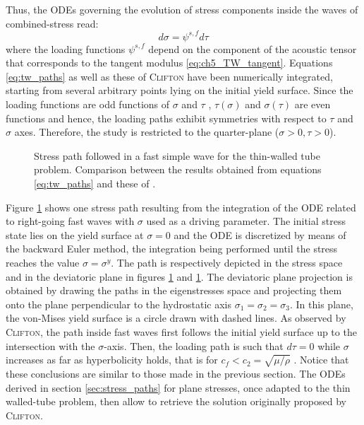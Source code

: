 Thus, the ODEs governing the evolution of stress components inside the waves of combined-stress read: 
\begin{equation}
  \label{eq:tw_paths}
  d\sigma = \psi^{s,f} d\tau
\end{equation}
where the loading functions $\psi^{s,f}$ depend on the component of the acoustic tensor that corresponds to the tangent modulus \eqref{eq:ch5_TW_tangent}.
Equations \eqref{eq:tw_paths} as well as these of \textsc{Clifton} \cite{Clifton} have been numerically integrated, starting from several arbitrary points lying on the initial yield surface.
Since the loading functions are odd functions of $\sigma$ and $\tau$ \cite{Clifton}, $\tau(\sigma)$ and $\sigma(\tau)$ are even functions and hence, the loading paths exhibit symmetries with respect to $\tau$ and $\sigma$ axes.
Therefore, the study is restricted to the quarter-plane ($\sigma>0,\tau>0$).
\begin{figure}[h!]
  \centering
   \qquad
  \caption{Stress path followed in a fast simple wave for the thin-walled tube problem. Comparison between the results obtained from equations \eqref{eq:tw_paths} and these of \cite{Clifton}.}
  \label{fig:fast_clifton}
\end{figure}
Figure \ref{fig:fast_clifton} shows one stress path resulting from the integration of the ODE related to right-going fast waves with $\sigma$ used as a driving parameter.
The initial stress state lies on the yield surface at $\sigma=0$ and the ODE is discretized by means of the backward Euler method, the integration being performed until the stress reaches the value $\sigma=\sigma^y $.
The path is respectively depicted in the stress space and in the deviatoric plane in figures \ref{fig:fast_clifton} and \ref{fig:fast_clifton}.
The deviatoric plane projection is obtained by drawing the paths in the eigenstresses space and projecting them onto the plane perpendicular to the hydrostatic axis $\sigma_1=\sigma_2=\sigma_3$.
In this plane, the von-Mises yield surface is a circle drawn with dashed lines.
As observed by \textsc{Clifton}, the path inside fast waves first follows the initial yield surface up to the intersection with the $\sigma$-axis.
Then, the loading path is such that $d\tau=0$ while $\sigma$ increases as far as hyperbolicity holds, that is for $c_f < c_2 = \sqrt{\mu/\rho} $ \cite{Clifton}.
Notice that these conclusions are similar to those made in the previous section.
The ODEs derived in section \ref{sec:stress_paths} for plane stresses, once adapted to the thin walled-tube problem, then allow to retrieve the solution originally proposed by \textsc{Clifton}.


